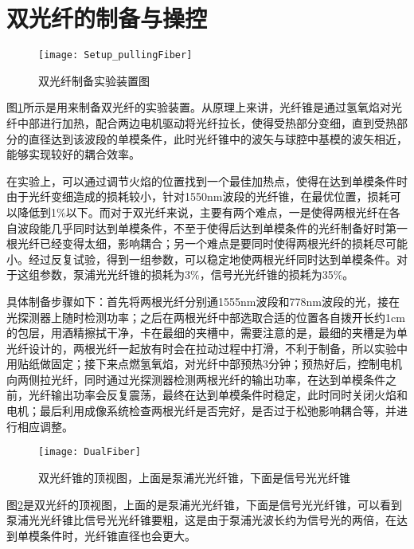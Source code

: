 \section{双光纤的制备与操控}


\begin{figure}
\centering
\texttt{[image: Setup\_pullingFiber]}
\caption{双光纤制备实验装置图}
\label{pic:Setup_pullingFiber}
\end{figure}

图\ref{pic:Setup_pullingFiber}所示是用来制备双光纤的实验装置。从原理上来讲，光纤锥是通过氢氧焰对光纤中部进行加热，配合两边电机驱动将光纤拉长，使得受热部分变细，直到受热部分的直径达到该波段的单模条件，此时光纤锥中的波矢与球腔中基模的波矢相近，能够实现较好的耦合效率。

在实验上，可以通过调节火焰的位置找到一个最佳加热点，使得在达到单模条件时由于光纤变细造成的损耗较小，针对1550nm波段的光纤锥，在最优位置，损耗可以降低到1$\%$以下。而对于双光纤来说，主要有两个难点，一是使得两根光纤在各自波段能几乎同时达到单模条件，不至于使得后达到单模条件的光纤制备好时第一根光纤已经变得太细，影响耦合；另一个难点是要同时使得两根光纤的损耗尽可能小。经过反复试验，得到一组参数，可以稳定地使两根光纤同时达到单模条件。对于这组参数，泵浦光光纤锥的损耗为3$\%$，信号光光纤锥的损耗为35$\%$。

具体制备步骤如下：首先将两根光纤分别通1555nm波段和778nm波段的光，接在光探测器上随时检测功率；之后在两根光纤中部选取合适的位置各自拨开长约1cm的包层，用酒精擦拭干净，卡在最细的夹槽中，需要注意的是，最细的夹槽是为单光纤设计的，两根光纤一起放有时会在拉动过程中打滑，不利于制备，所以实验中用贴纸做固定；接下来点燃氢氧焰，对光纤中部预热3分钟；预热好后，控制电机向两侧拉光纤，同时通过光探测器检测两根光纤的输出功率，在达到单模条件之前，光纤输出功率会反复震荡，最终在达到单模条件时稳定，此时同时关闭火焰和电机；最后利用成像系统检查两根光纤是否完好，是否过于松弛影响耦合等，并进行相应调整。

\begin{figure}
\centering
\texttt{[image: DualFiber]}
\caption{双光纤锥的顶视图，上面是泵浦光光纤锥，下面是信号光光纤锥}
\label{pic:DualFiber}
\end{figure}

图\ref{pic:DualFiber}是双光纤的顶视图，上面的是泵浦光光纤锥，下面是信号光光纤锥，可以看到泵浦光光纤锥比信号光光纤锥要粗，这是由于泵浦光波长约为信号光的两倍，在达到单模条件时，光纤锥直径也会更大。

